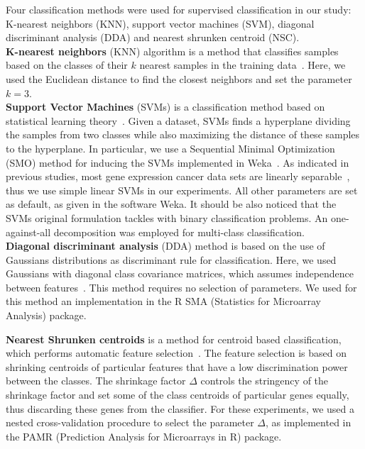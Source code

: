 \documentclass[10pt]{bmc_article}
\newenvironment{bmcformat}{\begin{raggedright}\baselineskip20pt\sloppy\setboolean{publ}{false}}{\end{raggedright}\baselineskip20pt\sloppy}
\begin{document}
\begin{bmcformat}
Four classification methods were used for supervised classification in
our study: K-nearest neighbors (KNN), support vector machines (SVM),
diagonal discriminant analysis (DDA) and nearest shrunken centroid
(NSC).\\

{\bf K-nearest neighbors} (KNN) algorithm is a method that classifies
samples based on the classes of their $k$ nearest samples in the
training data~\cite{Ripley1996}. Here, we used the Euclidean distance
to find the closest neighbors and set the parameter $k=3$.\\

{\bf Support Vector Machines} (SVMs) is a classification method based
on statistical learning theory~\cite{Vapnik1995}.  Given a dataset,
SVMs finds a hyperplane dividing the samples from two classes while
also maximizing the distance of these samples to the hyperplane. In
particular, we use a Sequential Minimal Optimization (SMO) method for
inducing the SVMs implemented in Weka~\cite{WIT05}. As indicated in
previous studies, most gene expression cancer data sets are linearly
separable~\cite{Lorena2008}, thus we use simple linear SVMs in our
experiments. All other parameters are set as default, as given in the
software Weka. It should be also noticed that the SVMs original
formulation tackles with binary classification problems. An
one-against-all decomposition was employed for multi-class
classification.\\

{\bf Diagonal discriminant analysis} (DDA) method is based on the use
of Gaussians distributions as discriminant rule for
classification. Here, we used Gaussians with diagonal class covariance
matrices, which assumes independence between
features~\cite{Dudoit2002}. This method requires no selection of
parameters. We used for this method an implementation in the R
SMA (Statistics for Microarray Analysis) package.


{\bf Nearest Shrunken centroids} is a method for centroid based
classification, which performs automatic feature
selection~\cite{Tibshirani2002}. The feature selection is based on
shrinking centroids of particular features that have a low
discrimination power between the classes. The shrinkage factor
$\Delta$ controls the stringency of the shrinkage factor and set some
of the class centroids of particular genes equally, thus
discarding these genes from the classifier. For these experiments, we
used a nested cross-validation procedure to select the parameter
$\Delta$, as implemented in the PAMR (Prediction Analysis for Microarrays
in R) package.\\


\end{bmcformat}
\end{document}
